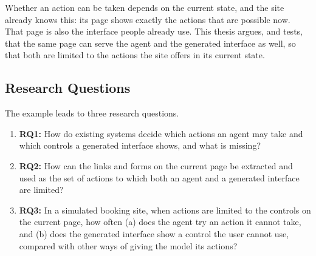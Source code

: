 Whether an action can be taken depends on the current state, and the site already knows this: its page shows exactly the actions that are possible now.
That page is also the interface people already use.
This thesis argues, and tests, that the same page can serve the agent and the generated interface as well, so that both are limited to the actions the site offers in its current state.

\subsection{Research Questions}\label{sec:intro:rq}

The example leads to three research questions.

\begin{enumerate}
    \item[] \textbf{RQ1:} How do existing systems decide which actions an agent may take and which controls a generated interface shows, and what is missing?

    \item[] \textbf{RQ2:} How can the links and forms on the current page be extracted and used as the set of actions to which both an agent and a generated interface are limited?

    \item[] \textbf{RQ3:} In a simulated booking site, when actions are limited to the controls on the current page, how often (a) does the agent try an action it cannot take, and (b) does the generated interface show a control the user cannot use, compared with other ways of giving the model its actions?
\end{enumerate}

